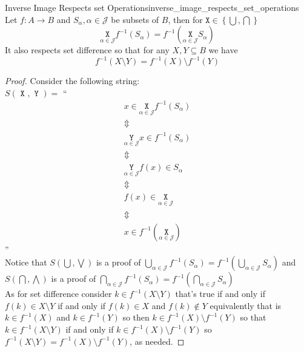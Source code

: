 \begin{proposition}{Inverse Image Respects set
Operations}{inverse_image_respects_set_operations}
Let \( f : A \to B \) and \( S _{ \alpha  }, \alpha \in \mathcal{ J }   \) be
subsets of \( B \), then for \( \texttt{X} \in  \left\{ \bigcup , \bigcap  \right\}  \) 
\[
 \underset{ \alpha \in  \mathcal{ J }   }{ \texttt{ X }  }  f ^{-1} \left( S _{
 \alpha  }  \right) = f ^{-1} \left( \underset{ \alpha \in \mathcal{ J }   }{
 \texttt{ X }  }  S _{ \alpha  }  \right) 
\]
It also respects set difference so that for any \( X, Y \subseteq B \) we have
\[
f ^{-1} \left( X \setminus Y \right) =  f ^{-1} \left( X \right) \setminus f
^{-1} \left( Y \right) 
\]
\end{proposition}
\begin{proof}
    Consider the following string:\\
    \( S\left( \texttt{ X } , \texttt{ Y }  \right) = \) ``
    \begin{gather*}
        x \in \underset{ \alpha \in \mathcal{ J }   }{ \texttt{ X }  }  f ^{-1} \left( S _{ \alpha  }
        \right) \\
        \Updownarrow \\
        \underset{ \alpha \in \mathcal{ J }   }{ \texttt{ Y }  } x \in  f ^{-1} \left( S _{ \alpha
        }  \right)  \\
        \Updownarrow \\
        \underset{ \alpha \in \mathcal{ J }   }{ \texttt{ Y }  } f  \left( x \right) \in  S _{
        \alpha } \\
        \Updownarrow \\
        f  \left( x \right) \in  \underset{ \alpha \in \mathcal{ J }   }{
        \texttt{ X }  }  \\
        \Updownarrow \\
        x \in  f ^{-1} \left( \underset{\alpha \in \mathcal{ J }}{\texttt{ X } } \right) 
    \end{gather*}
    ''\\
    Notice that  \( S\left( \bigcup , \bigvee  \right)  \) is a proof of \( \bigcup
    _{ \alpha  \in \mathcal{ J }   } f ^{-1} \left( S _{ \alpha  }  \right) = f
    ^{-1} \left( \bigcup _{ \alpha  \in  \mathcal{ J }   } S _{ \alpha  }
    \right) \) and \( S\left( \bigcap , \bigwedge  \right)  \) is a proof of \( \bigcap
    _{ \alpha  \in \mathcal{ J }   } f ^{-1} \left( S _{ \alpha  }  \right) = f
    ^{-1} \left( \bigcap _{ \alpha  \in  \mathcal{ J }   } S _{ \alpha  }
    \right) \)\\
    As for set difference consider \( k \in f ^{-1} \left( X \setminus Y \right)
    \) that's true if and only if \( f\left( k \right) \in X \setminus Y\) if
    and only if  \( f\left( k \right) \in  X \) and \( f\left( k \right) \not\in
    Y \) equivalently that is \( k \in f ^{-1} \left( X \right)  \) and \( k \in
    f ^{-1} \left( Y \right)  \) so then \( k \in  f ^{-1} \left( X \right)
    \setminus f ^{-1} \left( Y \right)  \) so that \( k \in  f ^{-1} \left( X
    \setminus Y \right) \) if and only if  \(  k \in f ^{-1} \left( X \right)
    \setminus f ^{-1} \left( Y \right)  \) so \( f ^{-1} \left( X \setminus Y
    \right) = f ^{-1} \left( X \right)  \setminus f ^{-1} \left( Y \right)  \),
    as needed.
\end{proof}
